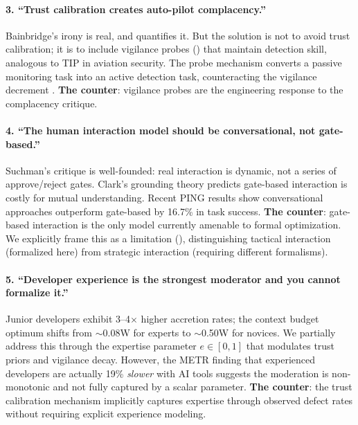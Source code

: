 \documentclass[11pt, a4paper, copyright]{googledeepmind}
\begin{document}
\paragraph{3. ``Trust calibration creates auto-pilot complacency.''} Bainbridge's irony is real, and  quantifies it. But the solution is not to avoid trust calibration; it is to include vigilance probes () that maintain detection skill, analogous to TIP in aviation security. The probe mechanism converts a passive monitoring task into an active detection task, counteracting the vigilance decrement \citep{warm2008vigilance}. \textbf{The counter}: vigilance probes are the engineering response to the complacency critique.

\paragraph{4. ``The human interaction model should be conversational, not gate-based.''} Suchman's critique \citep{suchman1987plans} is well-founded: real interaction is dynamic, not a series of approve/reject gates. Clark's grounding theory \citep{clark1996using} predicts gate-based interaction is costly for mutual understanding. Recent PING results show conversational approaches outperform gate-based by 16.7\% in task success. \textbf{The counter}: gate-based interaction is the only model currently amenable to formal optimization. We explicitly frame this as a limitation (), distinguishing tactical interaction (formalized here) from strategic interaction (requiring different formalisms).

\paragraph{5. ``Developer experience is the strongest moderator and you cannot formalize it.''} Junior developers exhibit 3--4$\times$ higher accretion rates; the context budget optimum shifts from $\sim$0.08W for experts to $\sim$0.50W for novices. We partially address this through the expertise parameter $e \in [0,1]$ that modulates trust priors and vigilance decay. However, the METR finding that experienced developers are actually 19\% \emph{slower} with AI tools \citep{metr2026} suggests the moderation is non-monotonic and not fully captured by a scalar parameter. \textbf{The counter}: the trust calibration mechanism implicitly captures expertise through observed defect rates without requiring explicit experience modeling.
\end{document}
